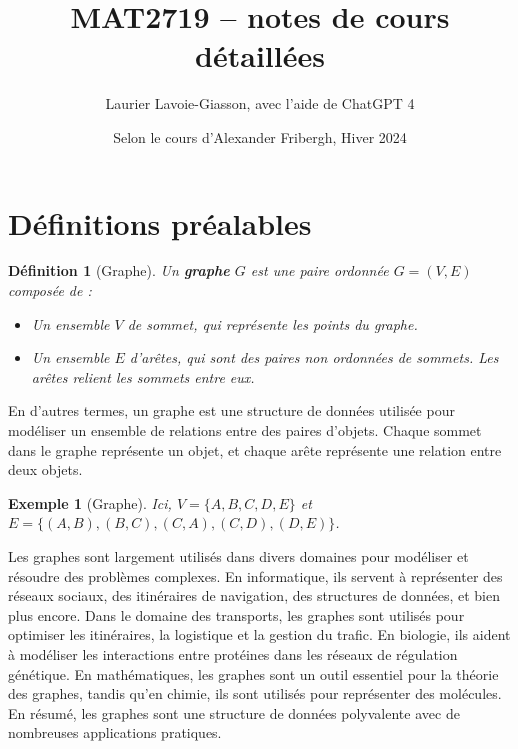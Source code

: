 \documentclass{article}
\title{MAT2719 -- notes de cours détaillées}
\date{Selon le cours d'Alexander Fribergh, Hiver 2024}
\author{Laurier Lavoie-Giasson, avec l'aide de ChatGPT 4}
\theoremstyle{pasdepoint}
\newtheorem{definition}{Définition}
\theoremstyle{break}
\newtheorem{example}{Exemple}
\theoremstyle{pasdepoint}
\begin{document}
\begin{titlepage}
    \maketitle
\end{titlepage}

\section{Définitions préalables}

\begin{definition}[Graphe]
    Un \textbf{graphe} $G$ est une paire ordonnée $G = (V, E)$ composée de :
    \begin{itemize}
        \item Un ensemble $V$ de \textit{sommet}, qui représente les points du graphe.
        \item Un ensemble $E$ d'\textit{arêtes}, qui sont des paires non ordonnées de sommets. Les arêtes relient les sommets entre eux.
    \end{itemize}
\end{definition}

En d'autres termes, un graphe est une structure de données utilisée pour modéliser un ensemble de relations entre des paires d'objets. Chaque sommet dans le graphe représente un objet, et chaque arête représente une relation entre deux objets.

    
\begin{example}[Graphe]

    Ici, $V = \{A, B, C, D, E\}$ et $E = \{(A, B), (B, C), (C, A), (C, D), (D, E)\}$.
\end{example}

Les graphes sont largement utilisés dans divers domaines pour modéliser et résoudre des problèmes complexes. En informatique, ils servent à représenter des réseaux sociaux, des itinéraires de navigation, des structures de données, et bien plus encore. Dans le domaine des transports, les graphes sont utilisés pour optimiser les itinéraires, la logistique et la gestion du trafic. En biologie, ils aident à modéliser les interactions entre protéines dans les réseaux de régulation génétique. En mathématiques, les graphes sont un outil essentiel pour la théorie des graphes, tandis qu'en chimie, ils sont utilisés pour représenter des molécules. En résumé, les graphes sont une structure de données polyvalente avec de nombreuses applications pratiques.
\end{document}
